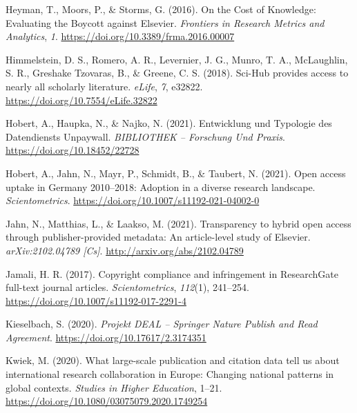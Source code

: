 \documentclass[
]{article}
\newlength{\cslhangindent}
\newlength{\cslentryspacingunit} %
\newenvironment{CSLReferences}[2] %
 {%
  \setlength{\parindent}{0pt}
  \ifodd #1
  \let\oldpar\par
  \def\par{\hangindent=\cslhangindent\oldpar}
  \fi
  \setlength{\parskip}{#2\cslentryspacingunit}
 }%
 {}
\begin{document}
\begin{CSLReferences}{1}{0}
\leavevmode{}%
Heyman, T., Moors, P., \& Storms, G. (2016). On the {Cost} of {Knowledge}: {Evaluating} the {Boycott} against {Elsevier}. \emph{Frontiers in Research Metrics and Analytics}, \emph{1}. \url{https://doi.org/10.3389/frma.2016.00007}

\leavevmode{}%
Himmelstein, D. S., Romero, A. R., Levernier, J. G., Munro, T. A., McLaughlin, S. R., Greshake Tzovaras, B., \& Greene, C. S. (2018). Sci-{Hub} provides access to nearly all scholarly literature. \emph{eLife}, \emph{7}, e32822. \url{https://doi.org/10.7554/eLife.32822}

\leavevmode{}%
Hobert, A., Haupka, N., \& Najko, N. (2021). Entwicklung und {Typologie} des {Datendiensts} {Unpaywall}. \emph{BIBLIOTHEK -- Forschung Und Praxis}. \url{https://doi.org/10.18452/22728}

\leavevmode{}%
Hobert, A., Jahn, N., Mayr, P., Schmidt, B., \& Taubert, N. (2021). Open access uptake in {Germany} 2010--2018: Adoption in a diverse research landscape. \emph{Scientometrics}. \url{https://doi.org/10.1007/s11192-021-04002-0}

\leavevmode{}%
Jahn, N., Matthias, L., \& Laakso, M. (2021). Transparency to hybrid open access through publisher-provided metadata: {An} article-level study of {Elsevier}. \emph{arXiv:2102.04789 {[}Cs{]}}. \url{http://arxiv.org/abs/2102.04789}

\leavevmode{}%
Jamali, H. R. (2017). Copyright compliance and infringement in {ResearchGate} full-text journal articles. \emph{Scientometrics}, \emph{112}(1), 241--254. \url{https://doi.org/10.1007/s11192-017-2291-4}

\leavevmode{}%
Kieselbach, S. (2020). \emph{Projekt {DEAL} -- {Springer} {Nature} {Publish} and {Read} {Agreement}}. \url{https://doi.org/10.17617/2.3174351}

\leavevmode{}%
Kwiek, M. (2020). What large-scale publication and citation data tell us about international research collaboration in {Europe}: Changing national patterns in global contexts. \emph{Studies in Higher Education}, 1--21. \url{https://doi.org/10.1080/03075079.2020.1749254}


\end{CSLReferences}
\end{document}
